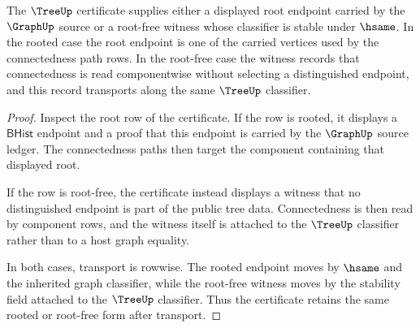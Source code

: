 \begin{theorem}
\label{thm:tree-root-or-root-free-witness-obligation}
The $\TreeUp$ certificate supplies either a displayed root endpoint carried by
the $\GraphUp$ source or a root-free witness whose classifier is stable under
$\hsame$. In the rooted case the root endpoint is one of the carried
vertices used by the connectedness path rows. In the root-free case the
witness records that connectedness is read componentwise without selecting a
distinguished endpoint, and this record transports along the same
$\TreeUp$ classifier.
\end{theorem}
\begin{proof}
Inspect the root row of the certificate. If the row is rooted, it displays a
$\mathsf{BHist}$ endpoint and a proof that this endpoint is carried by the
$\GraphUp$ source ledger. The connectedness paths then target the component
containing that displayed root.

If the row is root-free, the certificate instead displays a witness that no
distinguished endpoint is part of the public tree data. Connectedness is then
read by component rows, and the witness itself is attached to the
$\TreeUp$ classifier rather than to a host graph equality.

In both cases, transport is rowwise. The rooted endpoint moves by $\hsame$
and the inherited graph classifier, while the root-free witness moves by the
stability field attached to the $\TreeUp$ classifier. Thus the certificate
retains the same rooted or root-free form after transport.
\end{proof}

